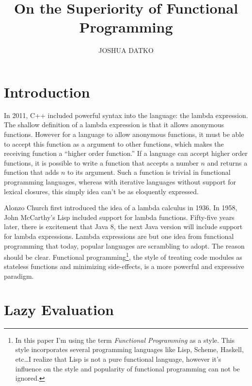 \documentclass[prodmode]{acmlarge}
\title{On the Superiority of Functional Programming}
\author{JOSHUA DATKO \affil{Drexel University}
}
\begin{document}
\maketitle





\section{Introduction}

In 2011, C++ included powerful syntax into the language: the lambda
expression.  The shallow definition of a lambda expression is that it
allows anonymous functions.  However for a language to allow anonymous
functions, it must be able to accept this function as a argument to
other functions, which makes the receiving function a ``higher order
function.''  If a language can accept higher order functions, it is
possible to write a function that accepts a number $n$ and returns a
function that adds $n$ to its argument.  Such a function is trivial in
functional programming languages, whereas with iterative languages
without support for lexical closures, this simply idea can't be as
eloquently expressed.

Alonzo Church first introduced the idea of a lambda calculus in 1936.
In 1958, John McCarthy's Lisp included support for lambda functions.
Fifty-five years later, there is excitement that Java 8, the next Java
version will include support for lambda expressions.  Lambda
expressions are but one idea from functional programming that today,
popular languages are scrambling to adopt.  The reason should be
clear.  Functional programming\footnote{In this paper I'm using the
  term \emph{Functional Programming} as a style.  This style
  incorporates several programming languages like Lisp, Scheme,
  Haskell, etc\ldots  I realize that Lisp is not a pure functional
  language, however it's influence on the style and popularity of
  functional programming can not be ignored.}, the style of treating code modules as
stateless functions and minimizing side-effects, is a more powerful
and expressive paradigm.

\section{Lazy Evaluation}
\end{document}

